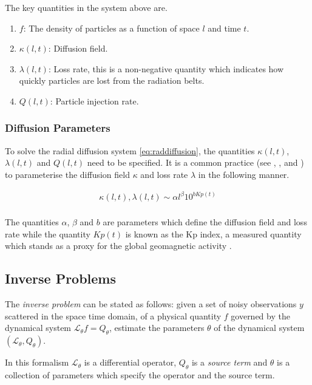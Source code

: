 \documentclass{article}
\begin{document}
The key quantities in the system above are.

\begin{enumerate}
\item $f$: The density of particles as a function of space $l$ and
  time $t$.
\item $\kappa(l, t)$: Diffusion field.
\item $\lambda(l, t)$: Loss rate, this is a non-negative
  quantity which indicates how quickly particles are lost from the
  radiation belts.
\item $Q(l, t)$: Particle injection rate.
\end{enumerate}

\subsubsection*{Diffusion Parameters}

To solve the radial diffusion system \ref{eq:raddiffusion}, the
quantities $\kappa(l, t)$, $\lambda(l, t)$ and $Q(l, t)$ need to be
specified. It is a common practice (see \citet{GRL:GRL10762},
\citet{JGRA:JGRA15067}, \citet{JGRA:JGRA18021} and
\citet{GRL:GRL22815}) to parameterise the diffusion field
$\kappa$ and loss rate $\lambda$ in the following manner.

\begin{align}
  \kappa(l,t), \lambda(l, t) \sim \alpha l^{\beta} 10^{b Kp(t)} \\
\end{align}

The quantities $\alpha$, $\beta$ and $b$ are parameters which define
the diffusion field and loss rate while the quantity $Kp(t)$ is known
as the Kp index, a measured quantity which stands as a proxy for the
global geomagnetic activity \cite{BartelsKp}.


\subsection{Inverse Problems}\label{sec:inv}

The \emph{inverse problem} can be stated as follows: given a set of
noisy observations $y$ scattered in the space time domain, of a
physical quantity $f$ governed by the dynamical system
$\mathcal{L}_{\theta} f = Q_{\theta}$, estimate the parameters $\theta$ of the
dynamical system $(\mathcal{L}_{\theta}, Q_{\theta})$.

In this formalism $\mathcal{L}_{\theta}$ is a differential operator,
$Q_{\theta}$ is a \emph{source term} and $\theta$ is a collection of parameters
which specify the operator and the source term.
\end{document}
